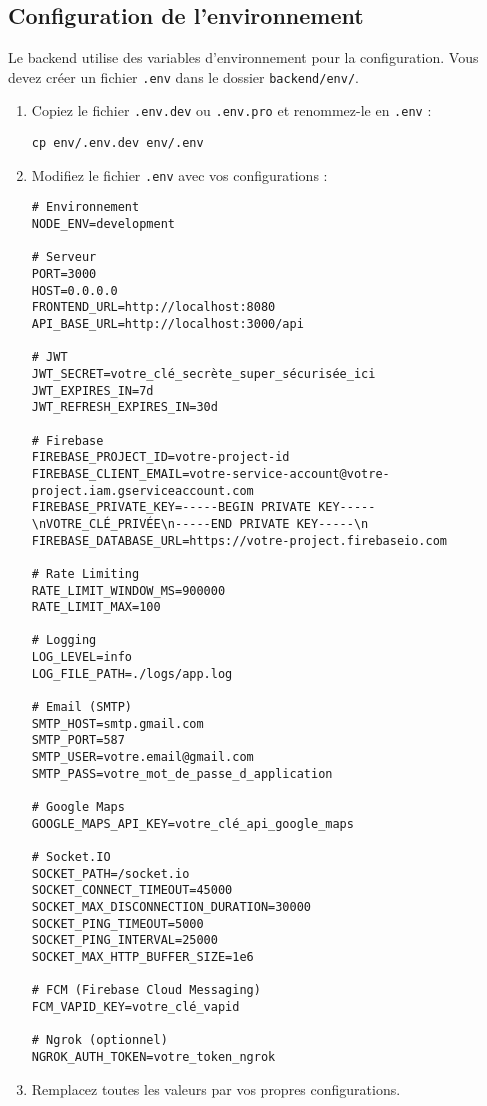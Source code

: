 \documentclass[12pt, a4paper]{article}
\begin{document}
\subsection{Configuration de l'environnement}
\begin{stepbox}
Le backend utilise des variables d'environnement pour la configuration. Vous devez créer un fichier \texttt{.env} dans le dossier \texttt{backend/env/}.

\begin{enumerate}
  \item Copiez le fichier \texttt{.env.dev} ou \texttt{.env.pro} et renommez-le en \texttt{.env} :
  \begin{lstlisting}
cp env/.env.dev env/.env
  \end{lstlisting}
  \item Modifiez le fichier \texttt{.env} avec vos configurations :
  \begin{lstlisting}
# Environnement
NODE_ENV=development

# Serveur
PORT=3000
HOST=0.0.0.0
FRONTEND_URL=http://localhost:8080
API_BASE_URL=http://localhost:3000/api

# JWT
JWT_SECRET=votre_clé_secrète_super_sécurisée_ici
JWT_EXPIRES_IN=7d
JWT_REFRESH_EXPIRES_IN=30d

# Firebase
FIREBASE_PROJECT_ID=votre-project-id
FIREBASE_CLIENT_EMAIL=votre-service-account@votre-project.iam.gserviceaccount.com
FIREBASE_PRIVATE_KEY=-----BEGIN PRIVATE KEY-----\nVOTRE_CLÉ_PRIVÉE\n-----END PRIVATE KEY-----\n
FIREBASE_DATABASE_URL=https://votre-project.firebaseio.com

# Rate Limiting
RATE_LIMIT_WINDOW_MS=900000
RATE_LIMIT_MAX=100

# Logging
LOG_LEVEL=info
LOG_FILE_PATH=./logs/app.log

# Email (SMTP)
SMTP_HOST=smtp.gmail.com
SMTP_PORT=587
SMTP_USER=votre.email@gmail.com
SMTP_PASS=votre_mot_de_passe_d_application

# Google Maps
GOOGLE_MAPS_API_KEY=votre_clé_api_google_maps

# Socket.IO
SOCKET_PATH=/socket.io
SOCKET_CONNECT_TIMEOUT=45000
SOCKET_MAX_DISCONNECTION_DURATION=30000
SOCKET_PING_TIMEOUT=5000
SOCKET_PING_INTERVAL=25000
SOCKET_MAX_HTTP_BUFFER_SIZE=1e6

# FCM (Firebase Cloud Messaging)
FCM_VAPID_KEY=votre_clé_vapid

# Ngrok (optionnel)
NGROK_AUTH_TOKEN=votre_token_ngrok
  \end{lstlisting}
  \item Remplacez toutes les valeurs par vos propres configurations.
\end{enumerate}
\end{stepbox}
\end{document}

